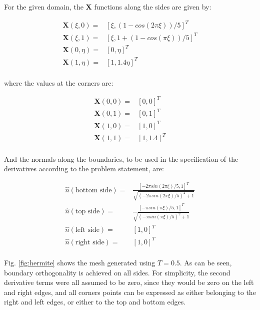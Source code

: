 \documentclass[10pt]{article}
\begin{document}
For the given domain, the \textbf{X} functions along the sides are given by:

\begin{equation}
\begin{aligned}
\textbf{X}(\xi, 0)=& \left\lbrack\xi, (1-cos(2\pi\xi))/5\right\rbrack^T\\
\textbf{X}(\xi, 1)=& \left\lbrack\xi, 1+(1-cos(\pi \xi))/5\right\rbrack^T\\
\textbf{X}(0, \eta)=& \left\lbrack0, \eta\right\rbrack^T\\
\textbf{X}(1, \eta)=& \left\lbrack1, 1.4\eta\right\rbrack^T\\
\end{aligned}
\end{equation}

where the values at the corners are:

\begin{equation}
\begin{aligned}
\textbf{X}(0, 0)=& \left\lbrack0, 0\right\rbrack^T\\
\textbf{X}(0, 1)=& \left\lbrack0, 1\right\rbrack^T\\
\textbf{X}(1, 0)=& \left\lbrack1, 0\right\rbrack^T\\
\textbf{X}(1, 1)=& \left\lbrack1, 1.4\right\rbrack^T\\
\end{aligned}
\end{equation}

And the normals along the boundaries, to be used in the specification of the derivatives according to the problem statement, are:

\begin{equation}
\begin{aligned}
\hat{n}(\textrm{bottom side})=&\frac{\left\lbrack-2\pi sin(2\pi\xi)/5, 1\right\rbrack^T}{\sqrt{(-2\pi sin(2\pi\xi)/5)^2+1}}\\
\hat{n}(\textrm{top side})=&\frac{\left\lbrack-\pi sin(\pi\xi)/5, 1\right\rbrack^T}{\sqrt{(-\pi sin(\pi\xi)/5)^2+1}}\\
\hat{n}(\textrm{left side})=&\left\lbrack1, 0\right\rbrack^T\\
\hat{n}(\textrm{right side})=&\left\lbrack1, 0\right\rbrack^T\\
\end{aligned}
\end{equation}

Fig. \ref{fig:hermite} shows the mesh generated using \(T=0.5\). As can be seen, boundary orthogonality is achieved on all sides. For simplicity, the second derivative terms were all assumed to be zero, since they would be zero on the left and right edges, and all corners points can be expressed as either belonging to the right and left edges, or either to the top and bottom edges.
\end{document}
